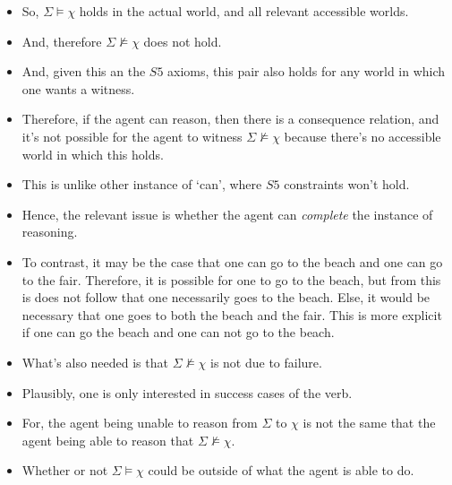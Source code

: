 \documentclass[10pt]{article}
\begin{document}
\begin{itemize}
\item So, \(\Sigma \vDash \chi\) holds in the actual world, and all relevant accessible worlds.
\item And, therefore \(\Sigma \nvDash \chi\) does not hold.
\item And, given this an the \(S5\) axioms, this pair also holds for any world in which one wants a witness.
\item Therefore, if the agent can reason, then there is a consequence relation, and it's not possible for the agent to witness \(\Sigma \nvDash \chi\) because there's no accessible world in which this holds.
\end{itemize}

\begin{itemize}
\item This is unlike other instance of `can', where \(S5\) constraints won't hold.
\item Hence, the relevant issue is whether the agent can \emph{complete} the instance of reasoning.
\item To contrast, it may be the case that one can go to the beach and one can go to the fair.
  Therefore, it is possible for one to go to the beach, but from this is does not follow that one necessarily goes to the beach.
  Else, it would be necessary that one goes to both the beach and the fair.
  This is more explicit if one can go the beach and one can not go to the beach.
\end{itemize}

\begin{itemize}
\item What's also needed is that \(\Sigma \nvDash \chi\) is not due to failure.
\item Plausibly, one is only interested in success cases of the verb.
\item For, the agent being unable to reason from \(\Sigma\) to \(\chi\) is not the same that the agent being able to reason that \(\Sigma \nvDash \chi\).
\item Whether or not \(\Sigma \vDash \chi\) could be outside of what the agent is able to do.
\end{itemize}
\end{document}
